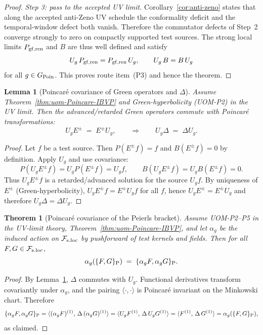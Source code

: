 \documentclass[10pt]{article}
\newcommand{\Fsloc}{\mathcal F_{\rm s.loc}}
\theoremstyle{definition}
\theoremstyle{plain}
\newtheorem{theorem}{Theorem}[section]
\newtheorem{lemma}{Lemma}[section]
\begin{document}
\begin{proof}
\emph{Step 3: pass to the accepted UV limit.}
Corollary~\ref{cor:anti-zeno} states that along the accepted anti-Zeno UV schedule the conformality deficit and the temporal-window defect both vanish.
Therefore the commutator defects of Step~2 converge strongly to zero on compactly supported test sources.  The strong local limits
$P_{\rm gf,ren}$ and $B$ are thus well defined and satisfy
\[
U_g\,P_{\rm gf,ren}=P_{\rm gf,ren}\,U_g,
\qquad
U_g\,B=B\,U_g
\]
for all $g\in G_{\rm Poin}$.  This proves route item~\textnormal{(P3)} and hence the theorem.
\end{proof}

\begin{lemma}[Poincar\'e covariance of Green operators and $\Delta$]
\label{lem:EB4}
Assume Theorem~\ref{thm:uom-Poincare-IBVP} and Green-hyperbolicity (UOM-P2) in the UV limit.  Then the advanced/retarded Green operators commute
with Poincar\'e transformations:
\[
U_g E^\pm \;=\; E^\pm U_g,
\qquad\Rightarrow\qquad
U_g \Delta \;=\; \Delta U_g.
\]
 \end{lemma}

 \begin{proof}
Let $f$ be a test source.  Then $P(E^\pm f)=f$ and $B(E^\pm f)=0$ by definition.
Apply $U_g$ and use covariance:
\[
P(U_g E^\pm f)=U_g P(E^\pm f)=U_g f,
\qquad
B(U_g E^\pm f)=U_g B(E^\pm f)=0.
\]
Thus $U_gE^\pm f$ is a retarded/advanced solution for the source $U_g f$.  By uniqueness of $E^\pm$ (Green-hyperbolicity),
$U_g E^\pm f = E^\pm U_g f$ for all $f$, hence $U_gE^\pm=E^\pm U_g$ and therefore $U_g\Delta=\Delta U_g$.
\end{proof}

\begin{theorem}[Poincar\'e covariance of the Peierls bracket]
\label{thm:Peierls-cov}
Assume UOM-P2--P5 in the UV-limit theory, Theorem~\ref{thm:uom-Poincare-IBVP}, and let $\alpha_g$ be the induced action on $\Fsloc$ by pushforward
of test kernels and fields.  Then for all $F,G\in\Fsloc$,
\[
\alpha_g(\{F,G\}_{\rm P})\;=\;\{\alpha_g F,\alpha_g G\}_{\rm P}.
\]
\end{theorem}

\begin{proof}
By Lemma~\ref{lem:EB4}, $\Delta$ commutes with $U_g$.  Functional derivatives transform covariantly under $\alpha_g$, and the pairing
$\langle\cdot,\cdot\rangle$ is Poincar\'e invariant on the Minkowski chart.  Therefore
\[
\{\alpha_g F,\alpha_g G\}_{\rm P}
=\langle (\alpha_gF)^{(1)},\,\Delta\,(\alpha_gG)^{(1)}\rangle
=\langle U_gF^{(1)},\,\Delta\,U_gG^{(1)}\rangle
=\langle F^{(1)},\,\Delta\,G^{(1)}\rangle
=\alpha_g(\{F,G\}_{\rm P}),
\]
as claimed.
\end{proof}
\end{document}
